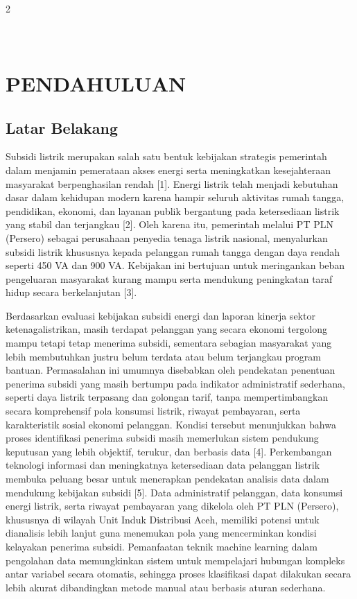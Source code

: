 \documentclass[12pt, a4paper, onecolumn, oneside]{report}
\begin{document}
\begin{spacing}{2}

\chapter[PENDAHULUAN]{\\ PENDAHULUAN}

\section{Latar Belakang}
Subsidi listrik merupakan salah satu bentuk kebijakan strategis pemerintah dalam menjamin pemerataan akses energi serta meningkatkan kesejahteraan masyarakat berpenghasilan rendah [1]. Energi listrik telah menjadi kebutuhan dasar dalam kehidupan modern karena hampir seluruh aktivitas rumah tangga, pendidikan, ekonomi, dan layanan publik bergantung pada ketersediaan listrik yang stabil dan terjangkau [2]. Oleh karena itu, pemerintah melalui PT PLN (Persero) sebagai perusahaan penyedia tenaga listrik nasional, menyalurkan subsidi listrik khususnya kepada pelanggan rumah tangga dengan daya rendah seperti 450 VA dan 900 VA. Kebijakan ini bertujuan untuk meringankan beban pengeluaran masyarakat kurang mampu serta mendukung peningkatan taraf hidup secara berkelanjutan [3].

Berdasarkan evaluasi kebijakan subsidi energi dan laporan kinerja sektor ketenagalistrikan, masih terdapat pelanggan yang secara ekonomi tergolong mampu tetapi tetap menerima subsidi, sementara sebagian masyarakat yang lebih membutuhkan justru belum terdata atau belum terjangkau program bantuan. Permasalahan ini umumnya disebabkan oleh pendekatan penentuan penerima subsidi yang masih bertumpu pada indikator administratif sederhana, seperti daya listrik terpasang dan golongan tarif, tanpa mempertimbangkan secara komprehensif pola konsumsi listrik, riwayat pembayaran, serta karakteristik sosial ekonomi pelanggan. Kondisi tersebut menunjukkan bahwa proses identifikasi penerima subsidi masih memerlukan sistem pendukung keputusan yang lebih objektif, terukur, dan berbasis data [4]. Perkembangan teknologi informasi dan meningkatnya ketersediaan data pelanggan listrik membuka peluang besar untuk menerapkan pendekatan analisis data dalam mendukung kebijakan subsidi [5]. Data administratif pelanggan, data konsumsi energi listrik, serta riwayat pembayaran yang dikelola oleh PT PLN (Persero), khususnya di wilayah Unit Induk Distribusi Aceh, memiliki potensi untuk dianalisis lebih lanjut guna menemukan pola yang mencerminkan kondisi kelayakan penerima subsidi. Pemanfaatan teknik machine learning dalam pengolahan data memungkinkan sistem untuk mempelajari hubungan kompleks antar variabel secara otomatis, sehingga proses klasifikasi dapat dilakukan secara lebih akurat dibandingkan metode manual atau berbasis aturan sederhana.


\end{spacing}
\end{document}
